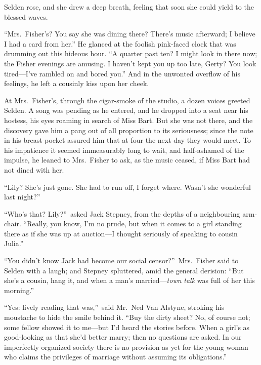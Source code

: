 \documentclass[12pt,a4paper]{book}
\begin{document}
Selden rose, and she drew a deep breath, feeling that soon she
could yield to the blessed waves.





``Mrs.\ Fisher's? You say she was dining there? There's music
afterward; I believe I had a card from her.'' He glanced at the
foolish pink-faced clock that was drumming out this hideous
hour. ``A quarter past ten? I might look in there now; the Fisher
evenings are amusing. I haven't kept you up too late, Gerty? You
look tired---I've rambled on and bored you.'' And in the
unwonted overflow of his feelings, he left a cousinly kiss upon
her cheek.







At Mrs.\ Fisher's, through the cigar-smoke of the studio, a dozen
voices greeted Selden. A song was pending as he entered, and he
dropped into a seat near his hostess, his eyes roaming in search
of Miss Bart. But she was not there, and the discovery gave him a
pang out of all proportion to its seriousness; since the note in
his breast-pocket assured him that at four the next day they
would meet. To his impatience it seemed immeasurably long to
wait, and half-ashamed of the impulse, he leaned to Mrs.\ Fisher
to ask, as the music ceased, if Miss Bart had not dined with her.





``Lily? She's just gone. She had to run off, I forget where. 
Wasn't she wonderful last night?''





``Who's that? Lily?''\ asked Jack Stepney, from the depths of a
neighbouring arm-chair. ``Really, you know, I'm no prude, but when
it comes to a girl standing there as if she was up at auction---I
thought seriously of speaking to cousin Julia.''





``You didn't know Jack had become our social censor?''\ Mrs.\ Fisher
said to Selden with a laugh; and Stepney spluttered, amid the
general derision: ``But she's a cousin, hang it, and when a man's
married---\textit{town} \textit{talk} was full of her this morning.''





``Yes: lively reading that was,''\ said Mr.\ Ned Van Alstyne,
stroking his moustache to hide the smile behind it. ``Buy the
dirty sheet? No, of course not; some fellow showed it to me---but
I'd heard the stories before. When a girl's as good-looking as
that she'd better marry; then no questions are asked. In our
imperfectly organized society there is no provision as yet for
the young woman who claims the privileges of marriage without
assuming its obligations.''
\end{document}
